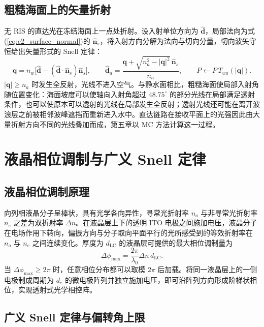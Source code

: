 \subsection{粗糙海面上的矢量折射}

无 RIS 的直达光在冻结海面上一点处折射。设入射单位方向为 $\hat{\mathbf d}$，局部法向为式(\ref{eq:c2_surface_normal})的 $\hat{\mathbf n}_s$，将入射方向分解为法向与切向分量，切向波矢守恒给出矢量形式的 Snell 定律：
\begin{equation}
\mathbf q=n_w\big[\hat{\mathbf d}-(\hat{\mathbf d}\cdot\hat{\mathbf n}_s)\hat{\mathbf n}_s\big],\qquad
\hat{\mathbf d}_a=\frac{\mathbf q+\sqrt{n_a^2-|\mathbf q|^2}\,\hat{\mathbf n}_s}{n_a},\qquad
P\leftarrow P\,T_{wa}(|\mathbf q|).
\label{eq:c2_vector_snell}
\end{equation}
$|\mathbf q|\ge n_a$ 时发生全反射，光线不进入空气。与静水面相比，粗糙海面使局部入射角随位置变化：海面坡度可以使轴向入射角超过 $48.75^\circ$ 的部分光线在局部满足透射条件，也可以使原本可以透射的光线在局部发生全反射；透射光线还可能在离开波浪层之前被相邻波峰遮挡而重新进入水中。直达链路在接收平面上的光强因此由大量折射方向不同的光线叠加而成，第五章以 MC 方法计算这一过程。

\section{液晶相位调制与广义 Snell 定律}
\label{sec:c2_lc}

\subsection{液晶相位调制原理}

向列相液晶分子呈棒状，具有光学各向异性，寻常光折射率 $n_o$ 与非寻常光折射率 $n_e$ 之差为双折射率 $\Delta n$。在液晶层上下的透明 ITO 电极之间施加电压，液晶分子在电场作用下转向，偏振方向与分子取向平面平行的光所感受到的等效折射率在 $n_o$ 与 $n_e$ 之间连续变化。厚度为 $d_{\mathrm{LC}}$ 的液晶层可提供的最大相位调制量为
\begin{equation}
\Delta\phi_{\max}=\frac{2\pi}{\lambda_0}\Delta n\,d_{\mathrm{LC}}.
\label{eq:c2_lc_phase}
\end{equation}
当 $\Delta\phi_{\max}\ge2\pi$ 时，任意相位分布都可以取模 $2\pi$ 后加载。将同一液晶层上的一侧电极制成周期为 $d_e$ 的微电极阵列并独立施加电压，即可沿阵列方向形成阶梯状相位，实现透射式光学相控阵。

\subsection{广义 Snell 定律与偏转角上限}

